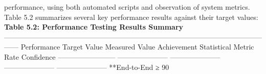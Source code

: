 performance, using both automated scripts and observation of system metrics. Table 5.2 summarizes several key performance results against their target values: \textbf{Table 5.2: Performance Testing Results Summary} ------------------------------------------------------------------------------------------------------------------ Performance Target Value Measured Value Achievement Statistical Metric Rate Confidence ------------------------ --------------------- --------------------- --------------------- --------------------- **End-to-End ≥ 90%
